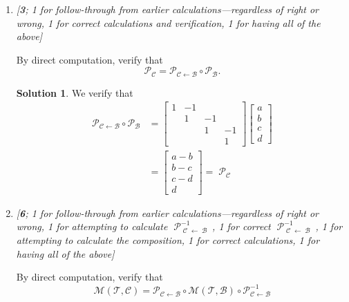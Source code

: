 \documentclass{amsart}
\theoremstyle{definition}
\theoremstyle{definition}
\newtheorem*{solution}{Solution}
\DeclareMathOperator{\1}{\mathbbm{1}}
\DeclareMathOperator{\powerset}{\mathcal{P}}
\DeclareMathOperator{\B}{\mathcal{B}}
\DeclareMathOperator{\CC}{\mathcal{C}}
\begin{document}
\begin{enumerate}[itemsep = 2mm]
\begin{enumerate}[label=\arabic*.]
			\item \textit{[\textbf{3}; 1 for follow-through from earlier calculations---regardless of right or wrong, 1 for correct calculations and verification, 1 for having all of the above]}
			
			By direct computation, verify that 
			\begin{equation*}
			\mathcal{P}_{\mathcal{C}}=\mathcal{P}_{\mathcal{C}\leftarrow\mathcal{B}}\circ \mathcal{P}_{\mathcal{B}}.
			\end{equation*}
			
			\begin{solution}
				We verify that
				\begin{align*}
				\mathcal{P}_{\mathcal{C}\leftarrow\mathcal{B}}\circ \mathcal{P}_{\mathcal{B}} &= \begin{bmatrix}
				1 & -1 & & \\ & 1 & -1 & \\ & & 1 & -1 \\ & & & 1
				\end{bmatrix} \begin{bmatrix}
				a \\ b \\ c \\ d
				\end{bmatrix} \\
				&= \begin{bmatrix}
				a-b \\ b-c \\ c-d \\ d
				\end{bmatrix} = \powerset_{\CC}
				\end{align*}
			\end{solution}
			
			
			\item \textit{[\textbf{6}; 1 for follow-through from earlier calculations---regardless of right or wrong, 1 for attempting to calculate $\powerset_{\CC \leftarrow \B}^{-1}$, 1 for correct $\powerset_{\CC \leftarrow \B}^{-1}$, 1 for attempting to calculate the composition, 1 for correct calculations, 1 for having all of the above]}
			
			By direct computation, verify that 
			\begin{equation*}
			\mathcal{M}(\mathcal{T},\mathcal{C})=\mathcal{P}_{\mathcal{C}\leftarrow\mathcal{B}}\circ\mathcal{M}(\mathcal{T},\mathcal{B})\circ \mathcal{P}_{\mathcal{C}\leftarrow\mathcal{B}}^{-1}
			\end{equation*}
			

\end{enumerate}
\end{enumerate}
\end{document}
